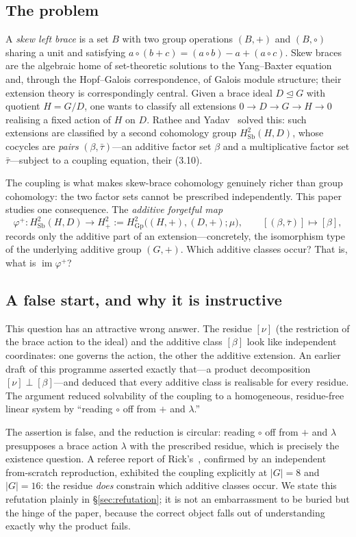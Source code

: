 \documentclass[11pt,reqno]{amsart}
\theoremstyle{plain}
\theoremstyle{definition}
\newcommand{\Sb}{\mathrm{Sb}}
\newcommand{\Gp}{\mathrm{Gp}}
\newcommand{\im}{\operatorname{im}}
\begin{document}
\subsection*{The problem}
A \emph{skew left brace} is a set $B$ with two group operations $(B,+)$ and $(B,\circ)$
sharing a unit and satisfying $a\circ(b+c)=(a\circ b)-a+(a\circ c)$. Skew braces are the
algebraic home of set-theoretic solutions to the Yang--Baxter equation and, through the
Hopf--Galois correspondence, of Galois module structure; their extension theory is
correspondingly central. Given a brace ideal $D\trianglelefteq G$ with quotient $H=G/D$,
one wants to classify all extensions $0\to D\to G\to H\to0$ realising a fixed action of
$H$ on $D$. Rathee and Yadav~\cite{RY} solved this: such extensions are classified by a
second cohomology group $H^2_{\Sb}(H,D)$, whose cocycles are \emph{pairs}
$(\beta,\bar\tau)$---an additive factor set $\beta$ and a multiplicative factor set
$\bar\tau$---subject to a coupling equation, their (3.10).

The coupling is what makes skew-brace cohomology genuinely richer than group cohomology:
the two factor sets cannot be prescribed independently. This paper studies one
consequence. The \emph{additive forgetful map}
\[
\varphi^{+}\colon H^2_{\Sb}(H,D)\longrightarrow H^2_+:=H^2_{\Gp}\big((H,+),(D,+);\mu\big),
\qquad [(\beta,\bar\tau)]\mapsto[\beta],
\]
records only the additive part of an extension---concretely, the isomorphism type of the
underlying additive group $(G,+)$. Which additive classes occur? That is, what is
$\im\varphi^{+}$?

\subsection*{A false start, and why it is instructive}
This question has an attractive wrong answer. The residue $[\nu]$ (the restriction of the
brace action to the ideal) and the additive class $[\beta]$ look like independent
coordinates: one governs the action, the other the additive extension. An earlier draft of
this programme asserted exactly that---a product decomposition $[\nu]\perp[\beta]$---and
deduced that every additive class is realisable for every residue. The argument reduced
solvability of the coupling to a homogeneous, residue-free linear system by ``reading
$\circ$ off from $+$ and $\lambda$.''

The assertion is false, and the reduction is circular: reading $\circ$ off from
$+$ and $\lambda$ presupposes a brace action $\lambda$ with the prescribed residue, which
is precisely the existence question. A referee report of Rick's~\cite{RickRef}, confirmed
by an independent from-scratch reproduction, exhibited the coupling explicitly at
$|G|=8$ and $|G|=16$: the residue \emph{does} constrain which additive classes occur. We
state this refutation plainly in \S\ref{sec:refutation}; it is not an embarrassment to be
buried but the hinge of the paper, because the correct object falls out of understanding
exactly why the product fails.
\end{document}

